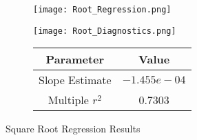 \documentclass{article}
\begin{document}
\begin{figure}[p] %
    \centering
    \begin{subfigure}{0.49\textwidth}
        \centering
        \texttt{[image: Root\_Regression.png]}
    \end{subfigure}
    \begin{subfigure}{0.49\textwidth}
        \centering
        \texttt{[image: Root\_Diagnostics.png]}
    \end{subfigure}
    \begin{subfigure}{\textwidth}
        \centering
        \vspace{0.5cm}
        \begin{tabular}{|c|c|}
        \hline
        Parameter & Value \\ \hline \hline
        Slope Estimate & $-1.455e-04$ \\ \hline
        Multiple $r^2$ & 0.7303 \\ \hline
        \end{tabular}
    \end{subfigure}
    \caption{Square Root Regression Results}
\end{figure}
\end{document}
